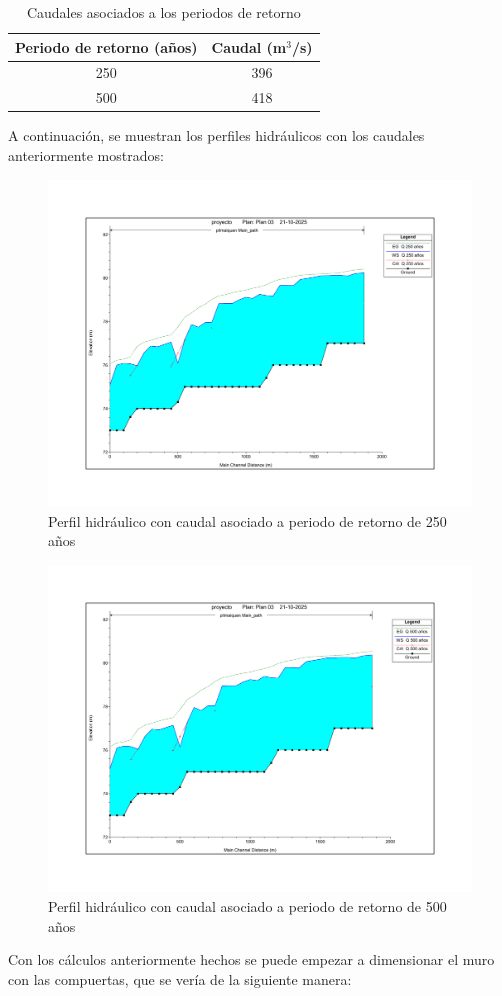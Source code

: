 \documentclass{article} %
\begin{document}
\begin{table}[h]
    \centering
    \begin{tabular}{c c}
        \textbf{Periodo de retorno (años)} & \textbf{Caudal (m$^3$/s)} \\
        \hline
        250 & 396 \\ 
        500 & 418 \\\hline
    \end{tabular}
    \caption{Caudales asociados a los periodos de retorno}
\end{table}

A continuación, se muestran los perfiles hidráulicos con los caudales anteriormente mostrados:

\begin{figure}[H]
    \centering
    \includegraphics[width=0.6\linewidth]{imagenes/perfil_250_sb.pdf}
    \caption{Perfil hidráulico con caudal asociado a periodo de retorno de 250 años}
\end{figure}

\begin{figure}[H]
    \centering
    \includegraphics[width=0.6\linewidth]{imagenes/perfil_500_sb.pdf}
    \caption{Perfil hidráulico con caudal asociado a periodo de retorno de 500 años}
\end{figure}

Con los cálculos anteriormente hechos se puede empezar a dimensionar el muro con las compuertas, que se vería de la siguiente manera:
\end{document}
